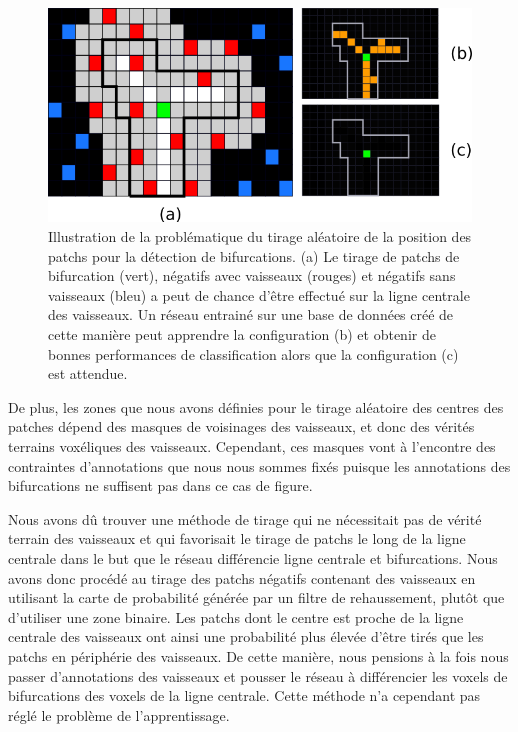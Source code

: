 \begin{figure}[!ht]
    \centering
    \includegraphics[width=\textwidth]{Images/exp_biais.png}
    \caption{Illustration de la problématique du tirage aléatoire de la position des patchs pour la détection de bifurcations. (a) Le tirage de patchs de bifurcation (vert), négatifs avec vaisseaux (rouges) et négatifs sans vaisseaux (bleu) a peut de chance d'être effectué sur la ligne centrale des vaisseaux. Un réseau entrainé sur une base de données créé de cette manière peut apprendre la configuration (b) et obtenir de bonnes performances de classification alors que la configuration (c) est attendue.}
    \label{fig:exp_patchs}
\end{figure}

De plus, les zones que nous avons définies pour le tirage aléatoire des centres des patches dépend des masques de voisinages des vaisseaux, et donc des vérités terrains voxéliques des vaisseaux. Cependant, ces masques vont à l'encontre des contraintes d'annotations que nous nous sommes fixés puisque les annotations des bifurcations ne suffisent pas dans ce cas de figure.

Nous avons dû trouver une méthode de tirage qui ne nécessitait pas de vérité terrain des vaisseaux et qui favorisait le tirage de patchs le long de la ligne centrale dans le but que le réseau différencie ligne centrale et bifurcations. Nous avons donc procédé au tirage des patchs négatifs contenant des vaisseaux en utilisant la carte de probabilité générée par un filtre de rehaussement, plutôt que d'utiliser une zone binaire. Les patchs dont le centre est proche de la ligne centrale des vaisseaux ont ainsi une probabilité plus élevée d'être tirés que les patchs en périphérie des vaisseaux. De cette manière, nous pensions à la fois nous passer d'annotations des vaisseaux et pousser le réseau à différencier les voxels de bifurcations des voxels de la ligne centrale. Cette méthode n'a cependant pas réglé le problème de l'apprentissage.

